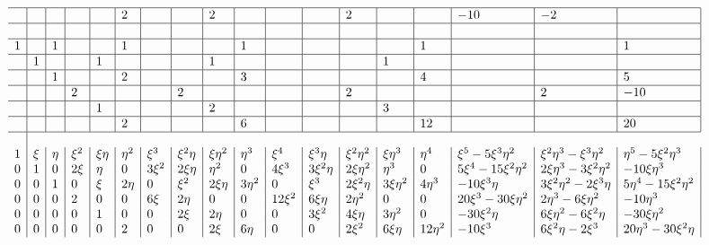 \documentclass{report}
\begin{document}
\begin{equation}
\begin{array}{l}
\begin{array}{l|l|l|l|l|l|l|l|l|l|l|l|l|l|l|l|l|l|l}
\hline
      &     &     &     &     &2    &     &     &2    &     &     &     &2    &     &     &-10  &-2   & \\
\hline
      &     &     &     &     &     &     &     &     &     &     &     &     &     &     &     &     & \\
\hline
 1    &     &1    &     &     &1    &     &     &     &1    &     &     &     &     &1    &     &     &1 \\
\hline
      &1    &     &     &1    &     &     &     &1    &     &     &     &     &1    &     &     &     & \\
\hline
      &     &1    &     &     &2    &     &     &     &3    &     &     &     &     &4    &     &     &5 \\
\hline
      &     &     &2    &     &     &     &2    &     &     &     &     &2    &     &     &     &2    &-10 \\
\hline
      &     &     &     &1    &     &     &     &2    &     &     &     &     &3    &     &     &     & \\
\hline
      &     &     &     &     &2    &     &     &     &6    &     &     &     &     &12   &     &     &20 \\
\hline
\\
1 
&\xi   &\eta 
&\xi^2 &\xi\eta     &\eta^2 
&\xi^3 &\xi^2\eta   &\xi\eta^2               &\eta^3 
&\xi^4 &\xi^3\eta   &\xi^2\eta^2             &\xi\eta^3              &\eta^4 
&\xi^5-5\xi^3\eta^2 &\xi^2\eta^3-\xi^3\eta^2 &\eta^5-5\xi^2\eta^3
\\
0 
&1      &0
&2\xi   &\eta         &0
&3\xi^2 &2\xi\eta     &\eta^2                  &0
&4\xi^3 &3\xi^2\eta   &2\xi\eta^2              &\eta^3         &0
&5\xi^4-15\xi^2\eta^2 &2\xi\eta^3-3\xi^2\eta^2 &-10\xi\eta^3
\\
0 
&0            &1
&0            &\xi                     &2\eta
&0            &\xi^2                   &2\xi\eta               &3\eta^2 
&0            &\xi^3                   &2\xi^2\eta             &3\xi\eta^2  &4\eta^3 
&-10\xi^3\eta &3\xi^2\eta^2-2\xi^3\eta &5\eta^4-15\xi^2\eta^2
\\
0 
&0                   &0
&2                   &0                  &0
&6\xi                &2\eta              &0                  &0
&12\xi^2             &6\xi\eta           &2\eta^2            &0              &0
&20\xi^3-30\xi\eta^2 &2\eta^3-6\xi\eta^2 &-10\eta^3
\\
0 
&0      &0
&0      &1            &0
&0      &2\xi         &2\eta                   &0
&0      &3\xi^2       &4\xi\eta                &3\eta^2         &0
&-30\xi^2\eta   &6\xi\eta^2-6\xi^2\eta &-30\xi\eta^2
\\
0 
&0            &0
&0            &0                       &2
&0            &0                       &2\xi                   &6\eta
&0            &0                       &2\xi^2                 &6\xi\eta    &12\eta^2 
&-10\xi^3     &6\xi^2\eta  -2\xi^3     &20\eta^3-30\xi^2\eta
\\
\end{array}
\end{array}
\end{equation}
\end{document}
